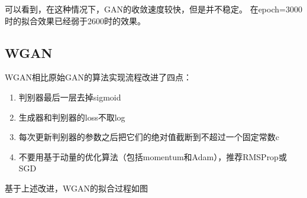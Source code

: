 \documentclass{article}
\begin{document}
可以看到，在这种情况下，GAN的收敛速度较快，但是并不稳定。
在epoch=3000时的拟合效果已经弱于2600时的效果。

\subsection{WGAN}

WGAN相比原始GAN的算法实现流程改进了四点：
\begin{enumerate}
    \item 判别器最后一层去掉sigmoid
    \item 生成器和判别器的loss不取log
    \item 每次更新判别器的参数之后把它们的绝对值截断到不超过一个固定常数c
    \item 不要用基于动量的优化算法（包括momentum和Adam），推荐RMSProp或SGD
\end{enumerate}

基于上述改进，WGAN的拟合过程如图
\end{document}
